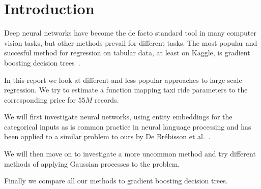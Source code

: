 \section{Introduction}%
\label{sec:introduction}

Deep neural networks have become the de facto standard tool in many computer
vision tasks, but other methods prevail for different tasks. The most popular
and succesful method for regression on tabular data, at least on Kaggle, is
gradient boosting decision trees~\cite{guo2016entity}.

In this report we look at different and less popular approaches to large scale
regression. We try to estimate a function mapping taxi ride parameters to the
corresponding price for $55M$ records.

We will first investigate neural networks, using entity embeddings for the
categorical inputs as is common practice in neural language processing and has
been applied to a similar problem to ours by De Br{\'e}bisson et
al.~\cite{de2015artificial}.

We will then move on to investigate a more uncommon method and try different
methods of applying Gaussian processes to the problem.

Finally we compare all our methods to gradient boosting decision trees.
